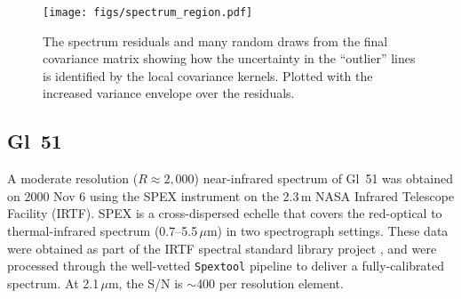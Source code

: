 \documentclass[iop,floatfix]{emulateapj}
\newcommand{\todo}[1]{ \textcolor{blue}{\\TODO: #1}}
\begin{document}

\begin{figure}[!htb]
\begin{center}
  \texttt{[image: figs/spectrum\_region.pdf]}
  \caption{The spectrum residuals and many random draws from the final covariance matrix showing how the uncertainty in the ``outlier'' lines is identified by the local covariance kernels. Plotted with the increased variance envelope over the residuals.
}
\label{fig:regions}
\end{center}
\end{figure}




\subsection{Gl~51}

A moderate resolution ($R\approx2,000$) near-infrared spectrum of Gl~51 was obtained on 2000 
Nov 6 using the SPEX instrument \citep{rayner03} on the 2.3\,m NASA Infrared Telescope Facility 
(IRTF).  SPEX is a cross-dispersed echelle that covers the red-optical to thermal-infrared spectrum 
(0.7--5.5\,$\mu$m) in two spectrograph settings.  These data were obtained as part of the IRTF 
spectral standard library project \citep{cushing05,rayner09}, and were processed through the 
well-vetted {\tt Spextool} pipeline \citep{cushing04,vacca03} to deliver a fully-calibrated 
spectrum.  At 2.1\,$\mu$m, the S/N is $\sim$400 per resolution element.
\end{document}
